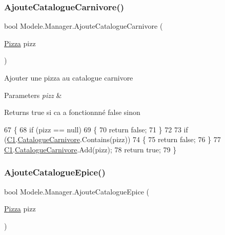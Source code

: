\subsubsection{\texorpdfstring{Ajoute\+Catalogue\+Carnivore()}{AjouteCatalogueCarnivore()}}
{\footnotesize\ttfamily bool Modele.\+Manager.\+Ajoute\+Catalogue\+Carnivore (\begin{DoxyParamCaption}\item[{\hyperlink{classModele_1_1Pizza}{Pizza}}]{pizz }\end{DoxyParamCaption})\hspace{0.3cm}{\ttfamily [inline]}}



Ajouter une pizza au catalogue carnivore 


\begin{DoxyParams}{Parameters}
{\em pizz} & \\
\hline
\end{DoxyParams}
\begin{DoxyReturn}{Returns}
true si ca a fonctionnné false sinon
\end{DoxyReturn}

\begin{DoxyCode}
67         \{
68             \textcolor{keywordflow}{if} (pizz == null)
69             \{
70                 \textcolor{keywordflow}{return} \textcolor{keyword}{false};
71             \}
72 
73             \textcolor{keywordflow}{if} (\hyperlink{classModele_1_1Manager_a54bbc7bd646fcaa0f1a590310dd3c02c}{C1}.\hyperlink{classModele_1_1Catalogue_a4af9ef768f67cef6dfe545e22a6d63af}{CatalogueCarnivore}.Contains(pizz))
74             \{
75                 \textcolor{keywordflow}{return} \textcolor{keyword}{false};
76             \}
77             \hyperlink{classModele_1_1Manager_a54bbc7bd646fcaa0f1a590310dd3c02c}{C1}.\hyperlink{classModele_1_1Catalogue_a4af9ef768f67cef6dfe545e22a6d63af}{CatalogueCarnivore}.Add(pizz);
78             \textcolor{keywordflow}{return} \textcolor{keyword}{true};
79         \}
\end{DoxyCode}
\mbox{\label{classModele_1_1Manager_a902832a7e3612ef3699a66ca6c4db0c5}} 
\subsubsection{\texorpdfstring{Ajoute\+Catalogue\+Epice()}{AjouteCatalogueEpice()}}
{\footnotesize\ttfamily bool Modele.\+Manager.\+Ajoute\+Catalogue\+Epice (\begin{DoxyParamCaption}\item[{\hyperlink{classModele_1_1Pizza}{Pizza}}]{pizz }\end{DoxyParamCaption})\hspace{0.3cm}{\ttfamily [inline]}}



